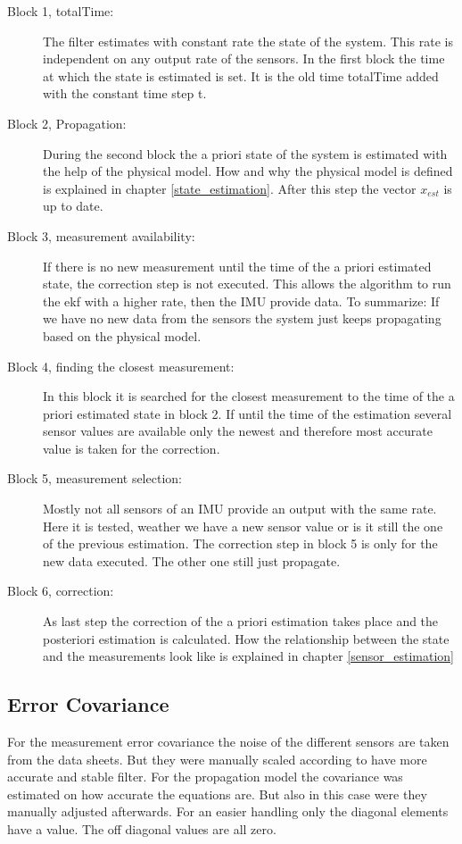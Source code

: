 \begin{description}
\item[Block 1, totalTime:]
The filter estimates with constant rate the state of the system. This rate is independent on any output rate of the sensors. In the first block the time at which the state is estimated is set. It is the old time totalTime added with the constant time step t.

\item[Block 2, Propagation:]
During the second block the a priori state of the system is estimated with the help of the physical model. How and why the physical model is defined is explained in chapter \ref{state_estimation}. After this step the vector $x_{est}$ is up to date.

\item[Block 3, measurement availability:]
If there is no new measurement until the time of the a priori estimated state, the correction step is not executed. This allows the algorithm to run the ekf with a higher rate, then the IMU provide data. To summarize: If we have no new data from the sensors the system just keeps propagating based on the physical model.

\item[Block 4, finding the closest measurement:]
In this block it is searched for the closest measurement to the time of the a priori estimated state in block 2. If until the time of the estimation several sensor values are available only the newest and therefore most accurate value is taken for the correction.

\item[Block 5, measurement selection:]
Mostly not all sensors of an IMU provide an output with the same rate. Here it is tested, weather we have a new sensor value or is it still the one of the previous estimation. The correction step in block 5 is only for the new data executed. The other one still just propagate.

\item[Block 6, correction:]
As last step the correction of the a priori estimation takes place and the posteriori estimation is calculated. How the relationship between the state and the measurements look like is explained in chapter \ref{sensor_estimation}
\end{description}


\subsection*{Error Covariance}
For the measurement error covariance the noise of the different sensors are taken from the data sheets. But  they were manually scaled according to have more accurate and stable filter. For the propagation model the covariance was estimated on how accurate the equations are. But also in this case were they manually adjusted afterwards. For an easier handling only the diagonal elements have a value. The off diagonal values are all zero.

